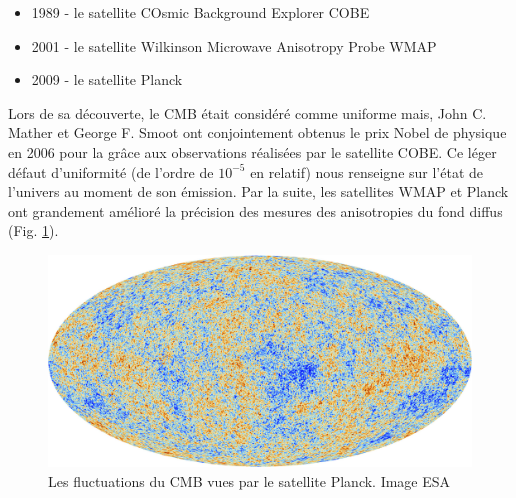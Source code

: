 \begin{itemize}
\item 1989 - le satellite COsmic Background Explorer COBE 
\item 2001 - le satellite Wilkinson Microwave Anisotropy Probe WMAP
\item 2009 - le satellite Planck
\end{itemize}

%
%

Lors de sa découverte, le \ac{CMB} était considéré comme uniforme mais, John C. Mather et George F. Smoot ont conjointement obtenus le prix Nobel de physique en 2006 pour la \cite{CMBanisotropiesNobel} grâce aux observations réalisées par le satellite  COBE.
Ce léger défaut d'uniformité (de l'ordre de $10^{-5}$ en relatif) nous renseigne sur l’état de l'univers au moment de son émission.
Par la suite, les satellites WMAP et Planck ont grandement amélioré la précision des mesures des anisotropies du fond diffus (Fig. \ref{fig:cmb}).

\begin{figure}
        \includegraphics[width=0.95 \textwidth]{img/01/CMB.jpeg} 

        \caption[CMB]{Les fluctuations du \ac{CMB} vues par le satellite Planck. 
        Image ESA}
 		\label{fig:cmb}
\end{figure}

